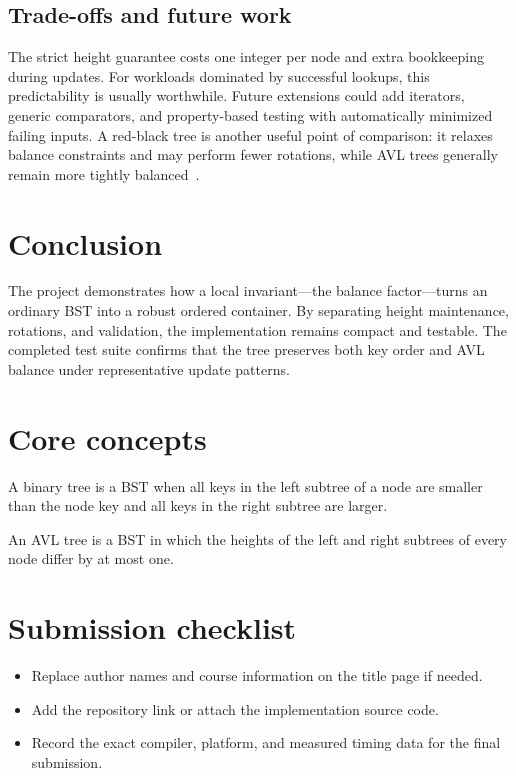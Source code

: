 \documentclass[lang=cn,a4paper,newtx,bibend=biber]{elegantpaper}
\begin{document}
\subsection{Trade-offs and future work}
The strict height guarantee costs one integer per node and extra bookkeeping during updates. For workloads dominated by successful lookups, this predictability is usually worthwhile. Future extensions could add iterators, generic comparators, and property-based testing with automatically minimized failing inputs. A red-black tree is another useful point of comparison: it relaxes balance constraints and may perform fewer rotations, while AVL trees generally remain more tightly balanced~\cite{cormen2022}.

\section{Conclusion}
The project demonstrates how a local invariant---the balance factor---turns an ordinary BST into a robust ordered container. By separating height maintenance, rotations, and validation, the implementation remains compact and testable. The completed test suite confirms that the tree preserves both key order and AVL balance under representative update patterns.

\appendix
\section{Core concepts}
\begin{definition}
A binary tree is a BST when all keys in the left subtree of a node are smaller than the node key and all keys in the right subtree are larger.
\end{definition}

\begin{definition}
An AVL tree is a BST in which the heights of the left and right subtrees of every node differ by at most one.
\end{definition}

\section{Submission checklist}
\begin{itemize}
  \item Replace author names and course information on the title page if needed.
  \item Add the repository link or attach the implementation source code.
  \item Record the exact compiler, platform, and measured timing data for the final submission.
\end{itemize}

\printbibliography[heading=bibintoc]
\end{document}
